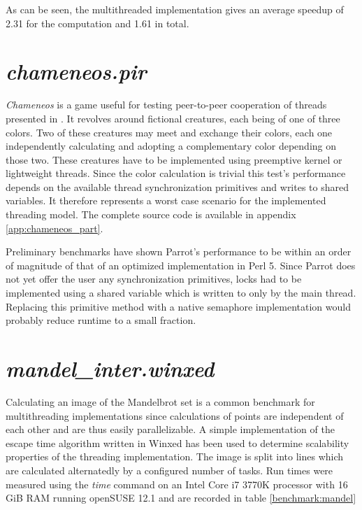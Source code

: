 \documentclass[bachelor,english]{hgbthesis}
\begin{document}
As can be seen, the multithreaded implementation gives an average speedup of 2.31 for the computation and 1.61 in total.

\section{\textit{chameneos.pir}}

\textit{Chameneos} is a game useful for testing peer-to-peer cooperation of threads presented in \cite{Chameneos}. It revolves around fictional creatures, each being of one of three colors. Two of these creatures may meet and exchange their colors, each one independently calculating and adopting a complementary color depending on those two. These creatures have to be implemented using preemptive kernel or lightweight threads. Since the color calculation is trivial this test's performance depends on the available thread synchronization primitives and writes to shared variables. It therefore represents a worst case scenario for the implemented threading model. The complete source code is available in appendix \ref{app:chameneos_part}.

Preliminary benchmarks have shown Parrot's performance to be within an order of magnitude of that of an optimized implementation in Perl 5. Since Parrot does not yet offer the user any synchronization primitives, locks had to be implemented using a shared variable which is written to only by the main thread. Replacing this primitive method with a native semaphore implementation would probably reduce runtime to a small fraction.

\section{\textit{mandel\_inter.winxed}}

Calculating an image of the Mandelbrot set \cite{Mandelbrot} is a common benchmark for multithreading implementations since calculations of points are independent of each other and are thus easily parallelizable. A simple implementation of the escape time algorithm written in Winxed has been used to determine scalability properties of the threading implementation. The image is split into lines which are calculated alternatedly by a configured number of tasks. Run times were measured using the \textit{time} command on an Intel Core i7 3770K processor with 16 GiB RAM running openSUSE 12.1 and are recorded in table \ref{benchmark:mandel}
\end{document}
